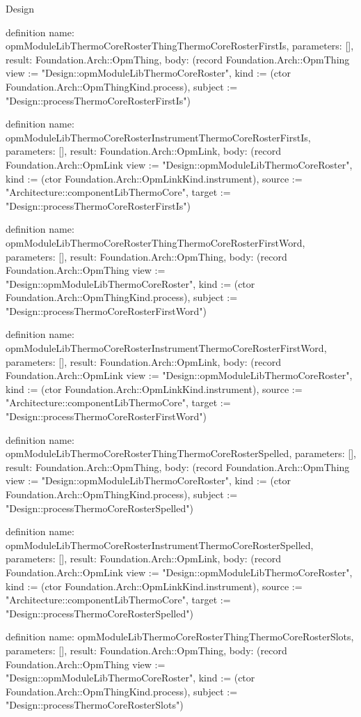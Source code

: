 \begin{lexlean}{Design}
\begin{semanticmodule}
definition{
  name: opmModuleLibThermoCoreRosterThingThermoCoreRosterFirstIs,
  parameters: [],
  result: Foundation.Arch::OpmThing,
  body: (record Foundation.Arch::OpmThing {view := "Design::opmModuleLibThermoCoreRoster", kind := (ctor Foundation.Arch::OpmThingKind.process), subject := "Design::processThermoCoreRosterFirstIs"})
}

definition{
  name: opmModuleLibThermoCoreRosterInstrumentThermoCoreRosterFirstIs,
  parameters: [],
  result: Foundation.Arch::OpmLink,
  body: (record Foundation.Arch::OpmLink {view := "Design::opmModuleLibThermoCoreRoster", kind := (ctor Foundation.Arch::OpmLinkKind.instrument), source := "Architecture::componentLibThermoCore", target := "Design::processThermoCoreRosterFirstIs"})
}

definition{
  name: opmModuleLibThermoCoreRosterThingThermoCoreRosterFirstWord,
  parameters: [],
  result: Foundation.Arch::OpmThing,
  body: (record Foundation.Arch::OpmThing {view := "Design::opmModuleLibThermoCoreRoster", kind := (ctor Foundation.Arch::OpmThingKind.process), subject := "Design::processThermoCoreRosterFirstWord"})
}

definition{
  name: opmModuleLibThermoCoreRosterInstrumentThermoCoreRosterFirstWord,
  parameters: [],
  result: Foundation.Arch::OpmLink,
  body: (record Foundation.Arch::OpmLink {view := "Design::opmModuleLibThermoCoreRoster", kind := (ctor Foundation.Arch::OpmLinkKind.instrument), source := "Architecture::componentLibThermoCore", target := "Design::processThermoCoreRosterFirstWord"})
}

definition{
  name: opmModuleLibThermoCoreRosterThingThermoCoreRosterSpelled,
  parameters: [],
  result: Foundation.Arch::OpmThing,
  body: (record Foundation.Arch::OpmThing {view := "Design::opmModuleLibThermoCoreRoster", kind := (ctor Foundation.Arch::OpmThingKind.process), subject := "Design::processThermoCoreRosterSpelled"})
}

definition{
  name: opmModuleLibThermoCoreRosterInstrumentThermoCoreRosterSpelled,
  parameters: [],
  result: Foundation.Arch::OpmLink,
  body: (record Foundation.Arch::OpmLink {view := "Design::opmModuleLibThermoCoreRoster", kind := (ctor Foundation.Arch::OpmLinkKind.instrument), source := "Architecture::componentLibThermoCore", target := "Design::processThermoCoreRosterSpelled"})
}

definition{
  name: opmModuleLibThermoCoreRosterThingThermoCoreRosterSlots,
  parameters: [],
  result: Foundation.Arch::OpmThing,
  body: (record Foundation.Arch::OpmThing {view := "Design::opmModuleLibThermoCoreRoster", kind := (ctor Foundation.Arch::OpmThingKind.process), subject := "Design::processThermoCoreRosterSlots"})
}


\end{semanticmodule}
\end{lexlean}

